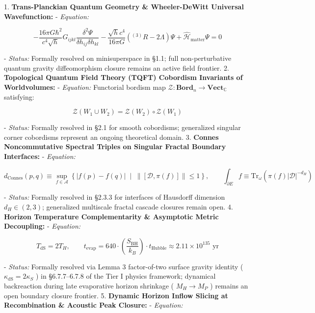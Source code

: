 \documentclass[11pt,a4paper]{article}
\theoremstyle{definition}
\theoremstyle{remark}
\begin{document}
1. \textbf{Trans-Planckian Quantum Geometry \& Wheeler-DeWitt Universal Wavefunction:}
- \textit{Equation:}


\begin{equation}
-\frac{16\pi G\hbar^2}{c^4\sqrt{h}} G_{ijkl} \frac{\delta^2 \Psi}{\delta h_{ij} \delta h_{kl}} - \frac{\sqrt{h} c^4}{16\pi G} ({}^{(3)}R - 2\Lambda) \Psi + \hat{\mathcal{H}}_{\text{matter}} \Psi = 0
\end{equation}


- \textit{Status:} Formally resolved on minisuperspace in \S 1.1; full non-perturbative quantum gravity diffeomorphism closure remains an active field frontier.
2. \textbf{Topological Quantum Field Theory (TQFT) Cobordism Invariants of Worldvolumes:}
- \textit{Equation:} Functorial bordism map $\mathcal{Z}: \mathbf{Bord}_n \to \mathbf{Vect}_{\mathbb{C}}$ satisfying:


\begin{equation}
\mathcal{Z}(W_1 \cup W_2) = \mathcal{Z}(W_2) \circ \mathcal{Z}(W_1)
\end{equation}


- \textit{Status:} Formally resolved in \S 2.1 for smooth cobordisms; generalized singular corner cobordisms represent an ongoing theoretical domain.
3. \textbf{Connes Noncommutative Spectral Triples on Singular Fractal Boundary Interfaces:}
- \textit{Equation:}


\begin{equation}
d_{\text{Connes}}(p, q) \equiv \sup_{f \in \mathcal{A}} \left\{ |f(p) - f(q)| \;\middle|\; \|[\mathcal{D}, \pi(f)]\| \le 1 \right\}, \qquad \int_{\partial E} f \equiv \mathrm{Tr}_\omega\left(\pi(f)|\mathcal{D}|^{-d_H}\right)
\end{equation}


- \textit{Status:} Formally resolved in \S 2.3.3 for interfaces of Hausdorff dimension $d_H \in (2, 3)$; generalized multiscale fractal cascade closures remain open.
4. \textbf{Horizon Temperature Complementarity \& Asymptotic Metric Decoupling:}
- \textit{Equation:}


\begin{equation}
T_{\text{dS}} = 2 T_H, \qquad t_{\text{evap}} = 640 \cdot \left(\frac{S_{\text{BH}}}{k_B}\right) \cdot t_{\text{Hubble}} \approx 2.11 \times 10^{135} \text{ yr}
\end{equation}


- \textit{Status:} Formally resolved via Lemma 3 factor-of-two surface gravity identity ( $\kappa_{\text{dS}} = 2\kappa_S$ ) in \S 6.7.7–6.7.8 of the Tier I physics framework; dynamical backreaction during late evaporative horizon shrinkage ( $M_H \to M_P$ ) remains an open boundary closure frontier.
5. \textbf{Dynamic Horizon Inflow Slicing at Recombination \& Acoustic Peak Closure:}
- \textit{Equation:}
\end{document}
